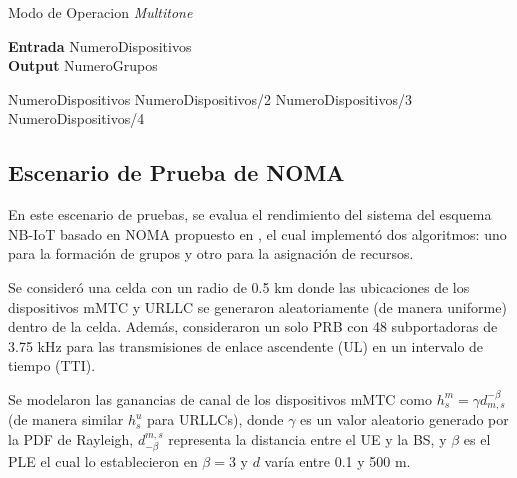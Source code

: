 \begin{algorithm}
    \caption{Modo de Operacion \textit{Multitone}}\label{euclid}
    \hspace*{\algorithmicindent} \textbf{Entrada} NumeroDispositivos\\
    \hspace*{\algorithmicindent} \textbf{Output} NumeroGrupos
    \begin{algorithmic}[1]
        \Return NumeroDispositivos
        \EndIf
        \Return NumeroDispositivos/2
        \EndIf
        \Return NumeroDispositivos/3
        \EndIf
        \Return NumeroDispositivos/4
        \EndIf
        \EndIf
    \EndIf
    \EndProcedure
    \end{algorithmic}
    \end{algorithm}

    \subsection{Escenario de Prueba de NOMA}

En este escenario de pruebas, se evalua el rendimiento del sistema del esquema NB-IoT basado en NOMA propuesto en \parencite{Shahini2019}, el cual implementó dos algoritmos: uno para la formación de grupos y otro para la asignación de recursos. \newline

Se consideró una celda con un radio de 0.5 km donde las ubicaciones de los dispositivos mMTC y URLLC se generaron aleatoriamente (de manera uniforme) dentro de la celda. Además, consideraron un solo PRB con 48 subportadoras de 3.75 kHz para las transmisiones de enlace ascendente (UL) en un intervalo de tiempo (TTI). \newline

Se modelaron las ganancias de canal de los dispositivos mMTC como $h_{s}^{m} = \gamma d^{ -\beta}_{ m, s}$ (de manera similar $h_{s}^{u}$ para URLLCs), donde $\gamma$ es un valor aleatorio generado por la PDF de Rayleigh, $d_{-\beta}^{m,s}$ representa la distancia entre el UE y la BS, y $\beta$ es el PLE el cual lo establecieron en $\beta = 3$ y $d$ varía entre 0.1 y 500 m. \newline

